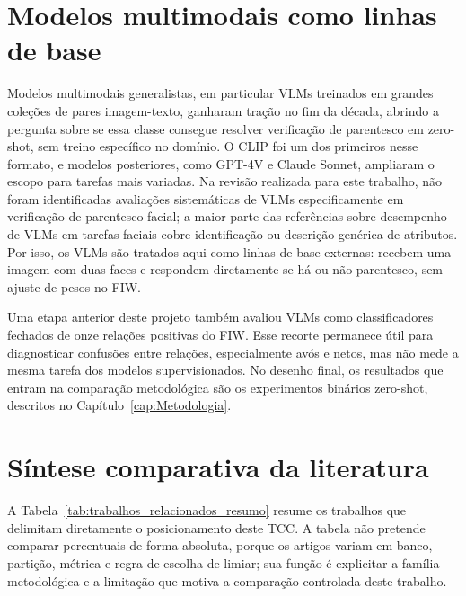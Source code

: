 \section{Modelos multimodais como linhas de base}

Modelos multimodais generalistas, em particular VLMs treinados em grandes coleções de pares imagem-texto, ganharam tração no fim da década, abrindo a pergunta sobre se essa classe consegue resolver verificação de parentesco em zero-shot, sem treino específico no domínio. O CLIP \cite{radford2021learning}
foi um dos primeiros nesse formato, e modelos posteriores, como GPT-4V e Claude Sonnet, ampliaram o escopo para tarefas mais variadas. Na revisão realizada para este trabalho, não foram identificadas avaliações sistemáticas de VLMs especificamente em verificação de parentesco facial; a maior parte das referências sobre desempenho de VLMs em tarefas faciais cobre identificação ou descrição genérica de atributos. Por isso, os VLMs são tratados aqui como linhas de base externas: recebem uma imagem com duas faces e respondem diretamente se há ou não parentesco, sem ajuste de pesos no FIW.

Uma etapa anterior deste projeto também avaliou VLMs como classificadores fechados de onze relações positivas do FIW. Esse recorte permanece útil para diagnosticar confusões entre relações, especialmente avós e netos, mas não mede a mesma tarefa dos modelos supervisionados. No desenho final, os resultados que entram na comparação metodológica são os experimentos binários zero-shot, descritos no Capítulo~\ref{cap:Metodologia}.

\section{Síntese comparativa da literatura}

A Tabela~\ref{tab:trabalhos_relacionados_resumo} resume os trabalhos que delimitam diretamente o posicionamento deste TCC. A tabela não pretende comparar percentuais de forma absoluta, porque os artigos variam em banco, partição, métrica e regra de escolha de limiar; sua função é explicitar a família metodológica e a limitação que motiva a comparação controlada deste trabalho.

